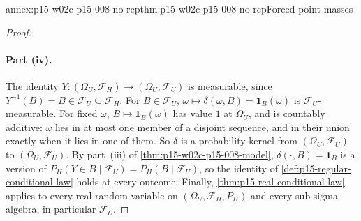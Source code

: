 \begin{annexitem}{annex:p15-w02c-p15-008-no-rcp}{thm:p15-w02c-p15-008-no-rcp}{Forced point masses}
\begin{proof}
\paragraph{Part (iv).}
The identity \(Y:(\Omega_U,\mathcal F_H)\to(\Omega_U,\mathcal F_U)\) is
measurable, since \(Y^{-1}(B)=B\in\mathcal F_U\subseteq\mathcal F_H\). For
\(B\in\mathcal F_U\), \(\omega\mapsto\delta(\omega,B)=\mathbf1_B(\omega)\)
is \(\mathcal F_U\)-measurable. For fixed \(\omega\),
\(B\mapsto\mathbf1_B(\omega)\) has value \(1\) at \(\Omega_U\), and is
countably additive: \(\omega\) lies in at most one member of a disjoint
sequence, and in their union exactly when it lies in one of them. So
\(\delta\) is a probability kernel from \((\Omega_U,\mathcal F_U)\) to
\((\Omega_U,\mathcal F_U)\). By part~(iii) of
\cref{thm:p15-w02c-p15-008-model}, \(\delta(\cdot,B)=\mathbf1_B\) is a
version of \(P_H(Y\in B\mid\mathcal F_U)=P_H(B\mid\mathcal F_U)\), so the
identity of \cref{def:p15-regular-conditional-law} holds at every
outcome. Finally, \cref{thm:p15-real-conditional-law} applies to every
real random variable on \((\Omega_U,\mathcal F_H,P_H)\) and every
sub-sigma-algebra, in particular \(\mathcal F_U\).
\end{proof}
\end{annexitem}
